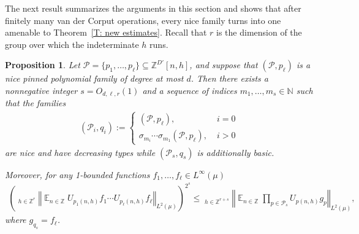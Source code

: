 \documentclass[11pt]{amsart}
\newtheorem{proposition}[lemma]{Proposition}
\theoremstyle{definition}
\DeclareMathOperator*{\oE}{\overline{\mathbb{E}}}
\DeclareMathOperator*{\E}{\mathbb{E}}
\newcommand{\N}{{\mathbb N}}
\newcommand{\Z}{{\mathbb Z}}
\newcommand{\CP}{{\mathcal P}}
\newcommand{\FI}{{\mathfrak I}}
\newcommand{\norm}[1]{\left\Vert #1\right\Vert}
\newcommand{\1}{{\mathbf{1}}}
\newcommand{\brac}[1]{\mathopen{}\left( #1 \mathclose{}\right)}
\begin{document}
The next result summarizes the arguments in this section and shows that after finitely many van der Corput operations, every nice family turns into one amenable to Theorem~\ref{T: new estimates}. Recall that $r$ is the dimension of the group over which the indeterminate $h$ runs. 

\begin{proposition}\label{P: types stabilize}
       Let $\CP= \{p_1, \ldots, p_\ell\}\subseteq \Z^{D'}[n, h]$, and suppose that $(\CP,p_{\ell})$ is a nice pinned polynomial family of degree at most $d$.
       Then there exists a nonnegative integer $s = O_{d,\ell,r}(1)$ and a sequence of indices $m_1, \ldots, m_s\in\N$ such that the families
       \begin{align*}
           (\CP_i,q_{i}) := \begin{cases}(\CP,p_{\ell}),\; &i=0\\
           \sigma_{m_i}\cdots \sigma_{m_1}(\CP,p_{\ell}),\; &i>0
           \end{cases}
       \end{align*}
       are nice and have decreasing types while $(\CP_s,q_s)$ is additionally basic. %

       Moreover, for any 1-bounded functions $f_1, \ldots, f_\ell\in L^\infty(\mu)$
       \begin{align}\label{E: vdc in PET}
           \brac{\oE_{h\in\Z^r}\norm{\E_{n\in\Z}U_{p_1(n,h)}f_1\cdots U_{p_{\ell}(n,h)}f_\ell}_{L^2(\mu)}}^{2^s}\leq \oE_{h\in\Z^{r+s}}\norm{\E_{n\in\Z}\prod_{p\in \CP_s}U_{p(n,h)}g_p}_{L^2(\mu)},
       \end{align}
       where $g_{q_{s}}=f_{\ell}$.
\end{proposition}
\end{document}
